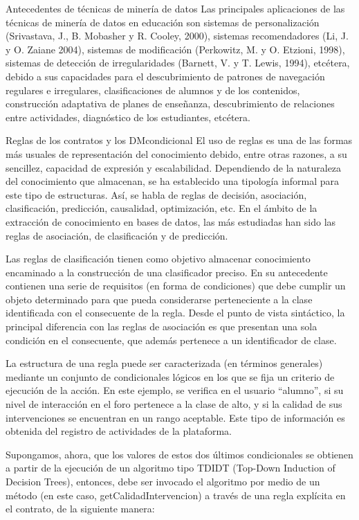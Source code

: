 \begin{itemize}
Antecedentes de técnicas de minería de datos Las principales aplicaciones de las
técnicas de minería de datos en educación son sistemas de personalización
(Srivastava, J., B. Mobasher y R. Cooley, 2000), sistemas recomendadores (Li, J.
y O. Zaiane 2004), sistemas de modificación (Perkowitz, M. y O. Etzioni, 1998),
sistemas de detección de irregularidades (Barnett, V. y T. Lewis, 1994),
etcétera, debido a sus capacidades para el descubrimiento de patrones
de navegación regulares e irregulares, clasificaciones de alumnos y de los
contenidos, construcción adaptativa de planes de enseñanza, descubrimiento de
relaciones entre actividades, diagnóstico de los estudiantes, etcétera.

Reglas de los contratos y los DMcondicional El uso de reglas es una de las
formas más usuales de representación del conocimiento debido, entre otras
razones, a su sencillez, capacidad de expresión y escalabilidad. Dependiendo de
la naturaleza del conocimiento que almacenan, se ha establecido una tipología
informal para este tipo de estructuras. Así, se habla de reglas de decisión,
asociación, clasificación, predicción, causalidad, optimización, etc. En el
ámbito de la extracción de conocimiento en bases de datos, las más estudiadas
han sido las reglas de asociación, de clasificación y de predicción.


Las reglas de clasificación tienen como objetivo almacenar
conocimiento encaminado a la construcción de una clasificador preciso. En su
antecedente contienen una serie de requisitos (en forma de condiciones) que debe
cumplir un objeto determinado para que pueda considerarse perteneciente a la
clase identificada con el consecuente de la regla. Desde el punto de
vista sintáctico, la principal diferencia con las reglas de asociación es que 
presentan una sola condición en el consecuente, que además pertenece a un
identificador de clase.


La estructura de una regla puede ser caracterizada (en términos
generales) mediante un conjunto de condicionales lógicos en los que se fija un
criterio de ejecución de la acción. En este ejemplo, se verifica en el usuario
“alumno”, si su nivel de interacción en el foro pertenece a la clase de alto, y
si la calidad de sus intervenciones se encuentran en un rango aceptable. Este
tipo de información es obtenida del registro de actividades de la plataforma.


Supongamos, ahora, que los valores de estos dos últimos condicionales se
obtienen a partir de la ejecución de un algoritmo tipo TDIDT (Top-Down Induction
of Decision Trees), entonces, debe ser invocado el algoritmo por medio de un
método (en este caso, getCalidadIntervencion) a través de una regla explícita
en el contrato, de la siguiente manera:


\end{itemize}
